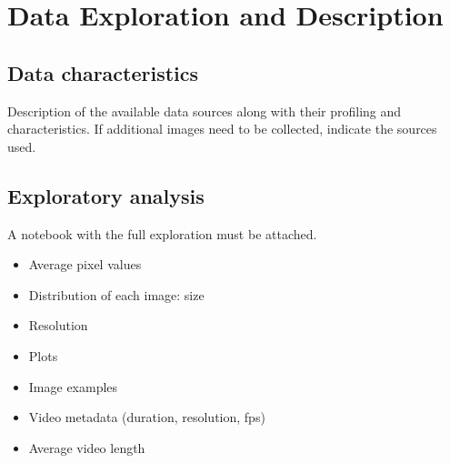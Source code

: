 \section{Data Exploration and Description}

\subsection{Data characteristics}
Description of the available data sources along with their profiling and characteristics. If additional images need to be collected, indicate the sources used.

\subsection{Exploratory analysis}
A notebook with the full exploration must be attached.

\begin{itemize}
    \item Average pixel values
    \item Distribution of each image: size
    \item Resolution
    \item Plots
    \item Image examples
    \item Video metadata (duration, resolution, fps)
    \item Average video length
\end{itemize}
